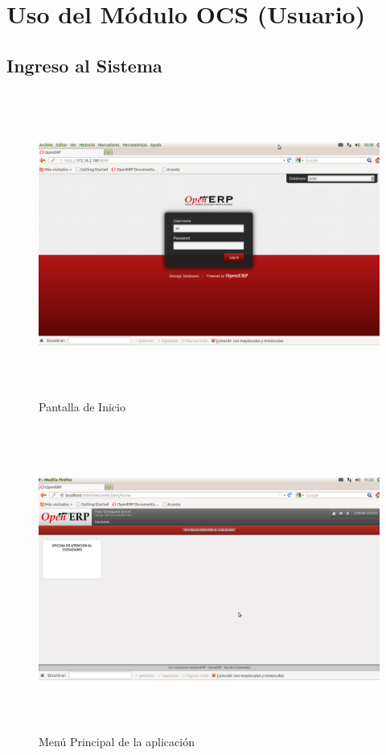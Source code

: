 %
%
\section{Uso del Módulo OCS (Usuario)}

\subsection{Ingreso al Sistema}
\begin{figure}[h]
 \centering
 \includegraphics[width=17cm,height=10cm]{./Imagenes/Login.png}
 \caption{Pantalla de Inicio}
 \label{fig:login}
\end{figure}



\begin{figure}[h]
 \centering
 \includegraphics[width=17cm,height=10cm]{./Imagenes/menumain.png}
 \caption{Menú Principal de la aplicación}
 \label{fig:menumain}
\end{figure}

